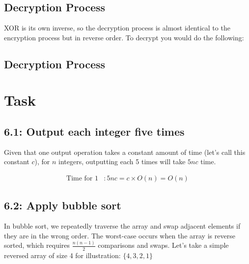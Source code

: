 \documentclass{article}
\begin{document}
\subsection*{Decryption Process}

XOR is its own inverse, so the decryption process is almost identical to the encryption process but in reverse order.
To decrypt you would do the following:

\subsection*{Decryption Process}



\section{Task}%

\subsection*{6.1: Output each integer five times}
Given that one output operation takes a constant amount of time (let's call this constant \(c\)), for \(n\) integers, outputting each 5 times will take \(5nc\) time.

\begin{align*}
  \text{Time for 1} & : 5nc = c \times O(n) = O(n)
\end{align*}

\subsection*{6.2: Apply bubble sort}
In bubble sort, we repeatedly traverse the array and swap adjacent elements if they are in the wrong order. The worst-case occurs when the array is reverse sorted, which requires \(\frac{n(n-1)}{2}\) comparisons and swaps.
Let's take a simple reversed array of size 4 for illustration: \( \{4, 3, 2, 1\} \)
\end{document}
